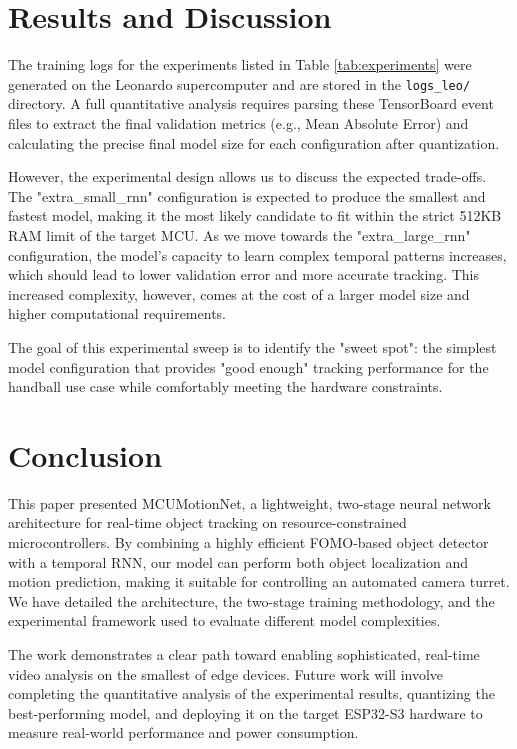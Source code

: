 \documentclass{article}
\begin{document}
\section{Results and Discussion}
The training logs for the experiments listed in Table \ref{tab:experiments} were generated on the Leonardo supercomputer and are stored in the \texttt{logs\_leo/} directory. A full quantitative analysis requires parsing these TensorBoard event files to extract the final validation metrics (e.g., Mean Absolute Error) and calculating the precise final model size for each configuration after quantization.

However, the experimental design allows us to discuss the expected trade-offs. The "extra\_small\_rnn" configuration is expected to produce the smallest and fastest model, making it the most likely candidate to fit within the strict 512KB RAM limit of the target MCU. As we move towards the "extra\_large\_rnn" configuration, the model's capacity to learn complex temporal patterns increases, which should lead to lower validation error and more accurate tracking. This increased complexity, however, comes at the cost of a larger model size and higher computational requirements.

The goal of this experimental sweep is to identify the "sweet spot": the simplest model configuration that provides "good enough" tracking performance for the handball use case while comfortably meeting the hardware constraints.

\section{Conclusion}
This paper presented MCUMotionNet, a lightweight, two-stage neural network architecture for real-time object tracking on resource-constrained microcontrollers. By combining a highly efficient FOMO-based object detector with a temporal RNN, our model can perform both object localization and motion prediction, making it suitable for controlling an automated camera turret. We have detailed the architecture, the two-stage training methodology, and the experimental framework used to evaluate different model complexities.

The work demonstrates a clear path toward enabling sophisticated, real-time video analysis on the smallest of edge devices. Future work will involve completing the quantitative analysis of the experimental results, quantizing the best-performing model, and deploying it on the target ESP32-S3 hardware to measure real-world performance and power consumption.
\end{document}
